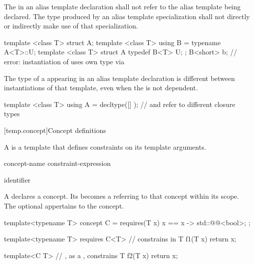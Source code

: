 \pnum
The  in an alias template declaration shall not refer to
the alias template being declared. The type produced by an alias template
specialization shall not directly or indirectly make use of that specialization.
\begin{example}
\begin{codeblock}
template <class T> struct A;
template <class T> using B = typename A<T>::U;
template <class T> struct A {
  typedef B<T> U;
};
B<short> b;         // error: instantiation of  uses own type via 
\end{codeblock}
\end{example}

\pnum
The type of a 
appearing in an alias template declaration
is different between instantiations of that template,
even when the  is not dependent.
\begin{example}
\begin{codeblock}
template <class T>
  using A = decltype([] { });   //  and  refer to different closure types
\end{codeblock}
\end{example}

[temp.concept]{Concept definitions}

\pnum
A  is a template
that defines constraints on its template arguments.

\begin{bnf}
\br
   concept-name  \terminal{=} constraint-expression \terminal{;}
\end{bnf}

\begin{bnf}
\br
  identifier
\end{bnf}

\pnum
A 
declares a concept.
Its  becomes a 
referring to that concept
within its scope.
The optional  appertains to the concept.
\begin{example}
\begin{codeblock}
template<typename T>
concept C = requires(T x) {
  { x == x } -> std::@@<bool>;
};

template<typename T>
  requires C<T>     //  constrains  in 
T f1(T x) { return x; }

template<C T>       // , as a , constrains 
T f2(T x) { return x; }
\end{codeblock}
\end{example}

